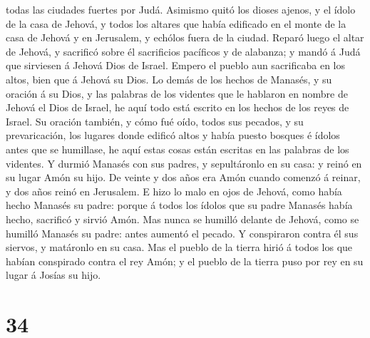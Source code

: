 todas las ciudades fuertes por Judá.  Asimismo quitó los
dioses ajenos, y el ídolo de la casa de Jehová, y todos los altares que
había edificado en el monte de la casa de Jehová y en Jerusalem, y
echólos fuera de la ciudad.  Reparó luego el altar de
Jehová, y sacrificó sobre él sacrificios pacíficos y de alabanza; y
mandó á Judá que sirviesen á Jehová Dios de Israel.  Empero
el pueblo aun sacrificaba en los altos, bien que á Jehová su Dios.
 Lo demás de los hechos de Manasés, y su oración á su Dios,
y las palabras de los videntes que le hablaron en nombre de Jehová el
Dios de Israel, he aquí todo está escrito en los hechos de los reyes de
Israel.  Su oración también, y cómo fué oído, todos sus
pecados, y su prevaricación, los lugares donde edificó altos y había
puesto bosques é ídolos antes que se humillase, he aquí estas cosas
están escritas en las palabras de los videntes.  Y durmió
Manasés con sus padres, y sepultáronlo en su casa: y reinó en su lugar
Amón su hijo.  De veinte y dos años era Amón cuando comenzó
á reinar, y dos años reinó en Jerusalem.  E hizo lo malo en
ojos de Jehová, como había hecho Manasés su padre: porque á todos los
ídolos que su padre Manasés había hecho, sacrificó y sirvió Amón.
 Mas nunca se humilló delante de Jehová, como se humilló
Manasés su padre: antes aumentó el pecado.  Y conspiraron
contra él sus siervos, y matáronlo en su casa.  Mas el
pueblo de la tierra hirió á todos los que habían conspirado contra el
rey Amón; y el pueblo de la tierra puso por rey en su lugar á Josías su
hijo. 

\hypertarget{section-33}{%
\section{34}\label{section-33}}

